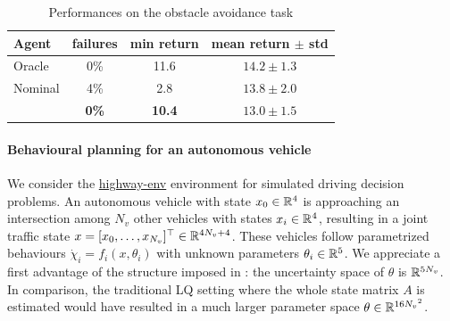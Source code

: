 \begin{table}[tbp]
	\caption{Performances on the obstacle avoidance task}
	\label{tab:obstacle}
	\centering
	\begin{tabular}{lccc}
		\toprule
		Agent &
		failures &
		min return &
		mean return $\pm$ std  \\
		\midrule
		Oracle & 0\% & {11.6} & {$14.2 \pm 1.3$} \\
		\midrule
		{Nominal} & {4\%} & {2.8} & \textbf{$\mathbf{13.8} \pm 2.0$} \\
		\Cref{alg:full} & \textbf{0\%} & \textbf{10.4} & {$13.0 \pm 1.5$} \\
		\bottomrule
	\end{tabular}
\end{table}

\paragraph{Behavioural planning for an autonomous vehicle}
We consider the \href{https://github.com/eleurent/highway-env}{highway-env} environment \citep{highway-env} for simulated driving decision problems. An autonomous vehicle with state $x_0\in\mathbb{R}^4$ is approaching an intersection among ${N_v}$ other vehicles with states $x_i\in\mathbb{R}^4$, resulting in a joint traffic state $x = [x_0, \dots,x_{N_v}]^\top\in\mathbb{R}^{4{N_v}+4}$. These vehicles follow parametrized behaviours $\dot{\chi}_i=f_i(x,\theta_i)$ with unknown parameters $\theta_i\in\mathbb{R}^5$. We appreciate a first advantage of the structure imposed in : the uncertainty space of $\theta$ is $\mathbb{R}^{5{N_v}}$. In comparison, the traditional LQ setting where the whole state matrix $A$ is estimated would have resulted in a much larger parameter space $\theta\in\mathbb{R}^{16{N_v}^2}$.
